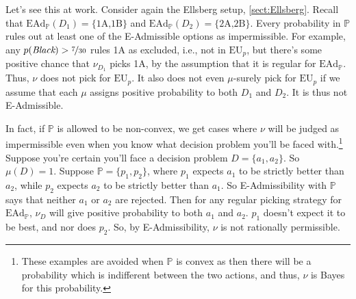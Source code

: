 \documentclass[a4paper]{article}
\renewcommand\P{\mathbb{P}} %
\newcommand\EU{\mathrm{EU}}
\newcommand\EAd{\mathrm{EAd}}
\newcommand{\IB}{\mathbb{B}}
\newcommand{\IP}{\P}
\newenvironment{CCM rewritten}
{\begingroup\color{blue}} %
{\endgroup}              %
\begin{document}




Let's see this at work. Consider again the Ellsberg setup, \cref{sect:Ellsberg}. Recall that $\EAd_\IP(D_1)=\{\text{1A,1B}\}$ and $\EAd_\IP(D_2)=\{\text{2A,2B}\}$. 
Every probability in $\IP$ rules out at least one of the E-Admissible options as impermissible. For example, any $p(\textit{Black})>\nicefrac{7}{30}$ rules 1A as excluded, i.e., not in $\EU_p$, but there's some positive chance that $\nu_{D_1}$ picks 1A, by the assumption that it is regular for $\EAd_\IP$. 
Thus, $\nu$ does not pick for $\EU_p$. It also does not even $\mu$-surely pick for $\EU_p$ if we assume that each $\mu$ assigns positive probability to both $D_1$ and $D_2$. It is thus not E-Admissible. 

In fact, if $\IP$ is allowed to be non-convex, we get cases where $\nu$ will be judged as impermissible even when you know what decision problem you'll be faced with.\footnote{These examples are avoided when $\IP$ is convex as then there will be  a probability which is indifferent between the two actions, and thus, $\nu$ is Bayes for this probability.}
Suppose you're certain you'll face a decision problem $D = \{a_1, a_2\}$. So $\mu(D) = 1$. Suppose $\IP = \{p_1, p_2\}$, where $p_1$ expects $a_1$ to be strictly better than $a_2$, while $p_2$ expects $a_2$ to be strictly better than $a_1$. So E-Admissibility with $\IP$ says that neither $a_1$ or $a_2$ are rejected. Then for any regular picking strategy for $\EAd_\IP$, $\nu_D$ will give positive probability to both $a_1$ and $a_2$. $p_1$ doesn't expect it to be best, and nor does $p_2$. So, by E-Admissibility, $\nu$ is not rationally permissible.
\end{document}
